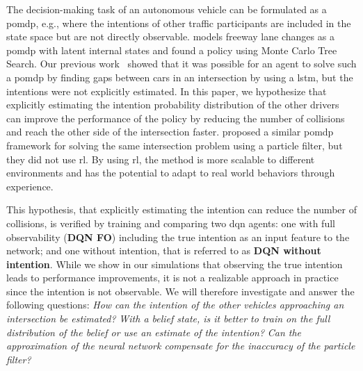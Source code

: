 The decision-making task of an autonomous vehicle can be formulated as a \gls{pomdp}, e.g., where the intentions of other traffic participants are included in the state space but are not directly observable. 
 models freeway lane changes as a \gls{pomdp} with latent internal states and found a policy using Monte Carlo Tree Search. 
Our previous work~\cite{Tram2018} showed that it was possible for an agent to solve such a \gls{pomdp} by finding gaps between cars in an intersection by using a \gls{lstm}, but the intentions were not explicitly estimated. In this paper, we hypothesize that explicitly estimating the intention probability distribution of the other drivers can improve the performance of the policy by reducing the number of collisions and reach the other side of the intersection faster.  proposed a similar \gls{pomdp} framework for solving the same intersection problem using a particle filter, but they did not use \gls{rl}. By using \gls{rl}, the method is more scalable to different environments and has the potential to adapt to real world behaviors through experience. 

This hypothesis, that explicitly estimating the intention can reduce the number of collisions, is verified by training and comparing two \gls{dqn} agents: one with full observability (\textbf{DQN FO}) including the true intention as an input feature to the network; and one without intention, that is referred to as \textbf{DQN without intention}. While we show in our simulations that observing the true intention leads to performance improvements, it is not a realizable approach in practice since the intention is not observable. 
We will therefore investigate and answer the following questions: \textit{How can the intention of the other vehicles approaching an intersection be estimated?} 
\textit{With a belief state, is it better to train on the full distribution of the belief or use an estimate of the intention?} \textit{Can the approximation of the neural network compensate for the inaccuracy of the particle filter?}

